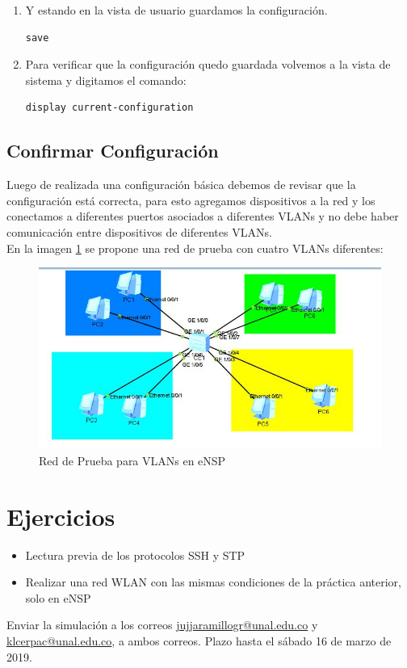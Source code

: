 \documentclass[journal]{IEEEtran}
\begin{document}
\begin{enumerate}
	\item Y estando en la vista de usuario guardamos la configuración.
	\begin{lstlisting}[frame=single]
save
	\end{lstlisting}
	
	\item Para verificar que la configuración quedo guardada volvemos a  la vista de sistema y digitamos el comando:
	\begin{lstlisting}[frame=single]
display current-configuration
	\end{lstlisting}
	
\end{enumerate}

\newpage

\subsection{\textbf{Confirmar Configuración}}
Luego de realizada una configuración básica debemos de revisar que la configuración está correcta, para esto agregamos dispositivos a la red y los conectamos a diferentes puertos asociados a diferentes VLANs y no debe haber comunicación entre dispositivos de diferentes VLANs. \\

En la imagen \ref{ensp} se propone una red de prueba con cuatro VLANs diferentes:

\begin{figure}[ht]
	\centering
	\includegraphics[scale=0.5]{2.jpg}
	\caption{Red de Prueba para VLANs en eNSP}
	\label{ensp}
\end{figure}

\section{Ejercicios}
\begin{itemize}
	\item Lectura previa de los protocolos SSH y STP
	\item Realizar una red WLAN con las mismas condiciones de la práctica anterior, solo en eNSP
\end{itemize}

Enviar la simulación a los correos \url{jujjaramillogr@unal.edu.co} y \url{klcerpac@unal.edu.co}, a ambos correos. Plazo hasta el sábado 16 de marzo de 2019.
\end{document}
